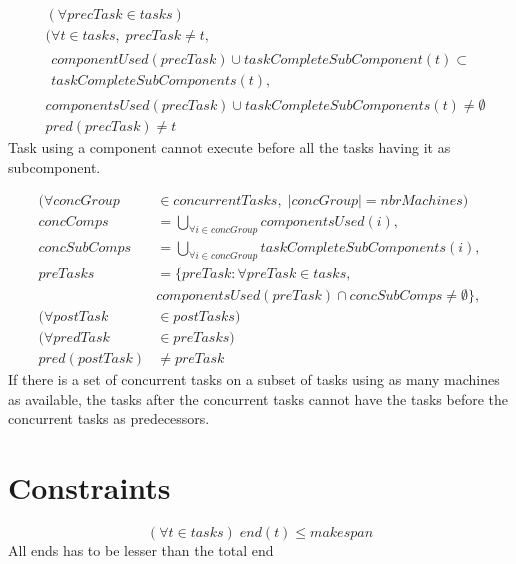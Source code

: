 \documentclass[10pt,a4paper]{report}
\begin{document}
\begin{equation}
\begin{aligned}\label{eq:90}
&(\forall precTask \in tasks) \\
&(\forall t \in tasks, \; precTask \neq t,\\
&\begin{aligned}componentUsed(precTask) \cup taskCompleteSubComponent(t) \subset\\
taskCompleteSubComponents(t), \end{aligned}\\
&componentsUsed(precTask) \cup taskCompleteSubComponents(t) \neq \emptyset \\
&pred(precTask) \neq t
\end{aligned}
\end{equation}
Task using a component cannot execute before all the tasks having it as subcomponent.

\begin{equation}
\begin{aligned}\label{eq:91}
(\forall concGroup &\in concurrentTasks, \; |concGroup| = nbrMachines) \\
concComps &= \bigcup_{\forall i \in concGroup}componentsUsed(i), \\
concSubComps &= \bigcup_{\forall i \in concGroup}taskCompleteSubComponents(i), \\
preTasks &= \{preTask : \forall preTask \in tasks,\\
&componentsUsed(preTask) \cap concSubComps \neq \emptyset\}, \\
(\forall postTask &\in postTasks) \\
(\forall predTask &\in preTasks) \\
pred(postTask) &\neq preTask
\end{aligned}
\end{equation}
If there is a set of concurrent tasks on a subset of tasks using as many machines as available, the tasks after the concurrent tasks cannot have the tasks before the concurrent tasks as predecessors.


\section*{Constraints}

\begin{equation}\label{eq:92}
(\forall t \in tasks) \; end(t) \le makespan
\end{equation}
All ends has to be lesser than the total end
\end{document}
